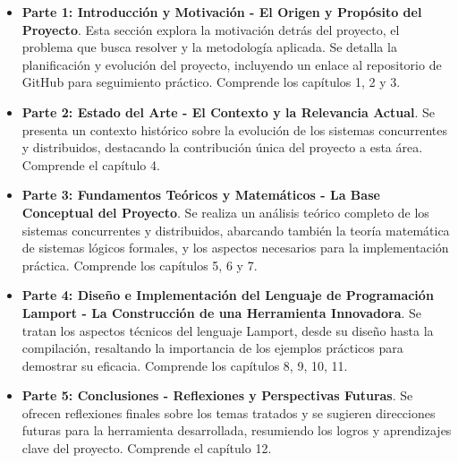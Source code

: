 \begin{itemize}
    \item \textbf{Parte 1: Introducción y Motivación - El Origen y Propósito del Proyecto}. Esta sección explora la motivación detrás del proyecto, el problema que busca resolver y la metodología aplicada. Se detalla la planificación y evolución del proyecto, incluyendo un enlace al repositorio de GitHub para seguimiento práctico. Comprende los capítulos 1, 2 y 3.
    \item \textbf{Parte 2: Estado del Arte - El Contexto y la Relevancia Actual}. Se presenta un contexto histórico sobre la evolución de los sistemas concurrentes y distribuidos, destacando la contribución única del proyecto a esta área. Comprende el capítulo 4.
    \item \textbf{Parte 3: Fundamentos Teóricos y Matemáticos - La Base Conceptual del Proyecto}. Se realiza un análisis teórico completo de los sistemas concurrentes y distribuidos, abarcando también la teoría matemática de sistemas lógicos formales, y los aspectos necesarios para la implementación práctica. Comprende los capítulos 5, 6 y 7.
    \item \textbf{Parte 4: Diseño e Implementación del Lenguaje de Programación Lamport - La Construcción de una Herramienta Innovadora}. Se tratan los aspectos técnicos del lenguaje Lamport, desde su diseño hasta la compilación, resaltando la importancia de los ejemplos prácticos para demostrar su eficacia. Comprende los capítulos 8, 9, 10, 11.
    \item \textbf{Parte 5: Conclusiones - Reflexiones y Perspectivas Futuras}. Se ofrecen reflexiones finales sobre los temas tratados y se sugieren direcciones futuras para la herramienta desarrollada, resumiendo los logros y aprendizajes clave del proyecto. Comprende el capítulo 12.

    
\end{itemize}